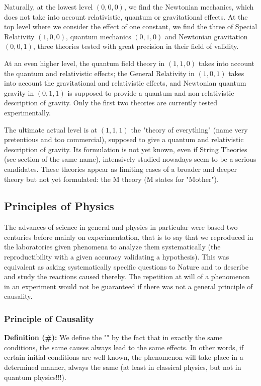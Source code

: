 	Naturally, at the lowest level $(0,0,0)$, we find the Newtonian mechanics, which does not take into account relativistic, quantum or gravitational effects. At the top level where we consider the effect of one constant, we find the three of Special Relativity $(1,0,0)$, quantum mechanics $(0,1,0)$ and Newtonian gravitation $( 0,0,1)$, three theories tested with great precision in their field of validity.
	
	At an even higher level, the quantum field theory in $(1,1,0)$ takes into account the quantum and relativistic effects; the General Relativity in $(1,0,1)$ takes into account the gravitational and relativistic effects, and Newtonian quantum gravity in $(0,1,1)$ is supposed to provide a quantum and non-relativistic description of gravity. Only the first two theories are currently tested experimentally.
	
	The ultimate actual level is at $(1,1,1)$ the "theory of everything" (name very pretentious and too commercial), supposed to give a quantum and relativistic description of gravity. Its formulation is not yet known, even if String Theories (see section of the same name), intensively studied nowadays seem to be a serious candidates. These theories appear as limiting cases of a broader and deeper theory but not yet formulated: the M theory (M states for "Mother").
	
	\subsection{Principles of Physics}
	The advances of science in general and physics in particular were based two centuries before mainly on experimentation, that is to say that we reproduced in the laboratories given phenomena to analyze them systematically (the reproductibility with a given accuracy validating a hypothesis). This was equivalent as asking systematically specific questions to Nature and to describe and study the reactions caused thereby. The repetition at will of a phenomenon in an experiment would not be guaranteed if there was not a general principle of causality.
	
	\subsubsection{Principle of Causality}
	\textbf{Definition (\#\mydef):} We define the "" by the fact that in exactly the same conditions, the same causes always lead to the same effects. In other words, if certain initial conditions are well known, the phenomenon will take place in a determined manner, always the same (at least in classical physics, but not in quantum physics!!!).

